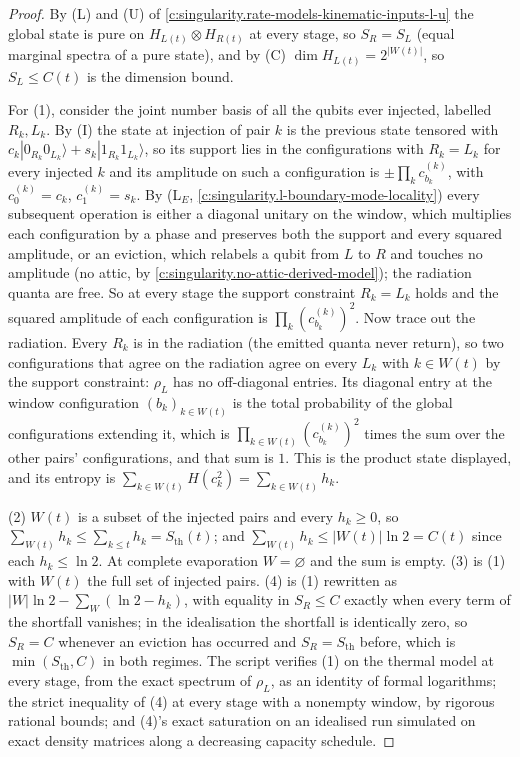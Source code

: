 \documentclass[11pt]{article}
\theoremstyle{definition}
\theoremstyle{plain}
\providecommand{\Sth}{}\renewcommand{\Sth}{S_{\mathrm{th}}}
\begin{document}
\begin{proof}
By (L) and (U) of \ref{c:singularity.rate-models-kinematic-inputs-l-u} the global state is pure on $H_{L(t)} \otimes H_{R(t)}$ at every stage, so $S_R = S_L$ (equal marginal spectra of a pure state), and by (C) $\dim H_{L(t)} = 2^{|W(t)|}$, so $S_L \leq C(t)$ is the dimension bound.

For (1), consider the joint number basis of all the qubits ever injected, labelled $R_k, L_k$. By (I) the state at injection of pair $k$ is the previous state tensored with $c_k|0_{R_k}0_{L_k}\rangle + s_k|1_{R_k}1_{L_k}\rangle$, so its support lies in the configurations with $R_k = L_k$ for every injected $k$ and its amplitude on such a configuration is $\pm\prod_k c^{(k)}_{b_k}$, with $c^{(k)}_0 = c_k$, $c^{(k)}_1 = s_k$. By (L$_E$, \ref{c:singularity.l-boundary-mode-locality}) every subsequent operation is either a diagonal unitary on the window, which multiplies each configuration by a phase and preserves both the support and every squared amplitude, or an eviction, which relabels a qubit from $L$ to $R$ and touches no amplitude (no attic, by \ref{c:singularity.no-attic-derived-model}); the radiation quanta are free. So at every stage the support constraint $R_k = L_k$ holds and the squared amplitude of each configuration is $\prod_k (c^{(k)}_{b_k})^{2}$. Now trace out the radiation. Every $R_k$ is in the radiation (the emitted quanta never return), so two configurations that agree on the radiation agree on every $L_k$ with $k \in W(t)$ by the support constraint: $\rho_L$ has no off-diagonal entries. Its diagonal entry at the window configuration $(b_k)_{k \in W(t)}$ is the total probability of the global configurations extending it, which is $\prod_{k \in W(t)}(c^{(k)}_{b_k})^{2}$ times the sum over the other pairs' configurations, and that sum is $1$. This is the product state displayed, and its entropy is $\sum_{k \in W(t)} H(c_k^{2}) = \sum_{k \in W(t)} h_k$.

(2) $W(t)$ is a subset of the injected pairs and every $h_k \geq 0$, so $\sum_{W(t)} h_k \leq \sum_{k \leq t} h_k = \Sth(t)$; and $\sum_{W(t)} h_k \leq |W(t)|\ln 2 = C(t)$ since each $h_k \leq \ln 2$. At complete evaporation $W = \varnothing$ and the sum is empty. (3) is (1) with $W(t)$ the full set of injected pairs. (4) is (1) rewritten as $|W|\ln 2 - \sum_{W}(\ln 2 - h_k)$, with equality in $S_R \leq C$ exactly when every term of the shortfall vanishes; in the idealisation the shortfall is identically zero, so $S_R = C$ whenever an eviction has occurred and $S_R = \Sth$ before, which is $\min(\Sth, C)$ in both regimes. The script verifies (1) on the thermal model at every stage, from the exact spectrum of $\rho_L$, as an identity of formal logarithms; the strict inequality of (4) at every stage with a nonempty window, by rigorous rational bounds; and (4)'s exact saturation on an idealised run simulated on exact density matrices along a decreasing capacity schedule.

\end{proof}
\end{document}
